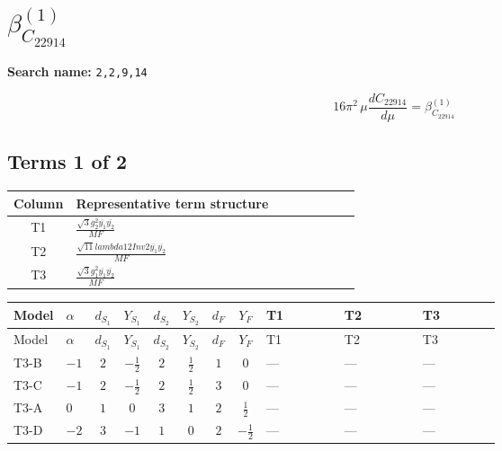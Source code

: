 \documentclass[8pt]{article}
\begin{document}
\begin{landscape}
\begin{longtable}{@{}llcccccc >{\raggedright\arraybackslash}p{0.21\linewidth} >{\raggedright\arraybackslash}p{0.21\linewidth} >{\raggedright\arraybackslash}p{0.21\linewidth}@{}}
\midrule
\bottomrule
\end{longtable}
\clearpage
\section*{$\beta_{C_{22914}}^{(1)}$}
\noindent\textbf{Search name: }\texttt{2,2,9,14}\par\smallskip
\[16\pi^2\,\mu\frac{d C_{22914}}{d\mu}=\beta_{C_{22914}}^{(1)}\]
\subsection*{Terms 1 of 2}
\begin{center}
\begin{tabular}{@{}c >{\raggedright\arraybackslash}p{0.82\linewidth}@{}}
\toprule
Column & Representative term structure \\
\midrule
T1 & \(\displaystyle \frac{\sqrt{3} g_{2}^{2} \overline{y_{1}} \overline{y_{2}}}{MF}\) \\
\midrule
T2 & \(\displaystyle \frac{\sqrt{11} lambda12Inv2 \overline{y_{1}} \overline{y_{2}}}{MF}\) \\
\midrule
T3 & \(\displaystyle \frac{\sqrt{3} g_{1}^{2} \overline{y_{1}} \overline{y_{2}}}{MF}\) \\
\midrule
\bottomrule
\end{tabular}
\end{center}
\smallskip
\tiny
\begin{longtable}{@{}llcccccc >{\raggedright\arraybackslash}p{0.21\linewidth} >{\raggedright\arraybackslash}p{0.21\linewidth} >{\raggedright\arraybackslash}p{0.21\linewidth}@{}}
\toprule
Model & $\alpha$ & $d_{S_1}$ & $Y_{S_1}$ & $d_{S_2}$ & $Y_{S_2}$ & $d_F$ & $Y_F$ & T1 & T2 & T3 \\
\midrule
\endfirsthead
\toprule
Model & $\alpha$ & $d_{S_1}$ & $Y_{S_1}$ & $d_{S_2}$ & $Y_{S_2}$ & $d_F$ & $Y_F$ & T1 & T2 & T3 \\
\midrule
\endhead
T3-B & $-1$ & $2$ & $-\frac{1}{2}$ & $2$ & $\frac{1}{2}$ & $1$ & $0$ & --- & --- & --- \\
\midrule
T3-C & $-1$ & $2$ & $-\frac{1}{2}$ & $2$ & $\frac{1}{2}$ & $3$ & $0$ & --- & --- & --- \\
\midrule
T3-A & $0$ & $1$ & $0$ & $3$ & $1$ & $2$ & $\frac{1}{2}$ & --- & --- & --- \\
\midrule
T3-D & $-2$ & $3$ & $-1$ & $1$ & $0$ & $2$ & $-\frac{1}{2}$ & --- & --- & --- \\
\midrule

\end{longtable}
\end{landscape}
\end{document}
